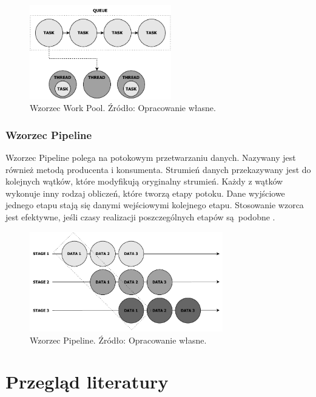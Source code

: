 \documentclass[12pt]{article}
\begin{document}
\begin{figure}[H]
    \centering
	\includegraphics[width=0.55\textwidth]{patterns-work-pool.pdf}
    \caption{Wzorzec Work Pool. Źródło: Opracowanie własne.}
    \label{fig:work-pool}
\end{figure}

\subsubsection{Wzorzec Pipeline}
Wzorzec Pipeline polega na potokowym przetwarzaniu danych. Nazywany jest również metodą producenta
i konsumenta. Strumień danych przekazywany jest do kolejnych wątków, które modyfikują oryginalny strumień.
Każdy z wątków wykonuje inny rodzaj obliczeń, które tworzą etapy potoku. Dane wyjściowe jednego etapu
stają się danymi wejściowymi kolejnego etapu. Stosowanie wzorca jest efektywne, jeśli czasy realizacji
poszczególnych etapów są~podobne \cite{wprowadzenie-do-obliczen-rownoleglych}.

\begin{figure}[H]
    \centering
	\includegraphics[width=0.75\textwidth]{patterns-pipeline.pdf}
    \caption{Wzorzec Pipeline. Źródło: Opracowanie własne.}
    \label{fig:pipeline}
\end{figure}

\newpage

\section{Przegląd literatury}
\end{document}
